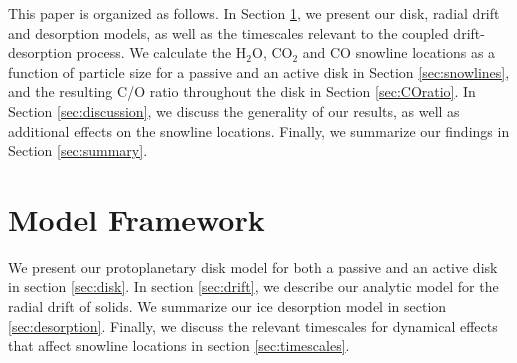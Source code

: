 \documentclass[apj]{emulateapj}
\newcommand{\emgr}[1]{\emph{ \color{gray} #1}}
\begin{document}



This paper is organized as follows. In Section \ref{sec:model}, we present our disk, radial drift and desorption models, as well as the timescales relevant to the coupled drift-desorption process. We calculate the H$_2$O, CO$_2$ and CO snowline locations as a function of particle size for a passive and an active disk in Section \ref{sec:snowlines}, and the resulting C/O ratio throughout the disk in Section \ref{sec:COratio}. In Section \ref{sec:discussion}, we discuss the generality of our results, as well as additional effects on the snowline locations. Finally, we summarize our findings in Section \ref{sec:summary}.

\section{Model Framework} 
\label{sec:model}

We present our protoplanetary disk model for both a passive and an active disk in section \ref{sec:disk}. In section \ref{sec:drift}, we describe our analytic model for the radial drift of solids. We summarize our ice desorption model in section \ref{sec:desorption}. Finally, we discuss the relevant timescales for dynamical effects that affect snowline locations %
in section \ref{sec:timescales}.
\end{document}
